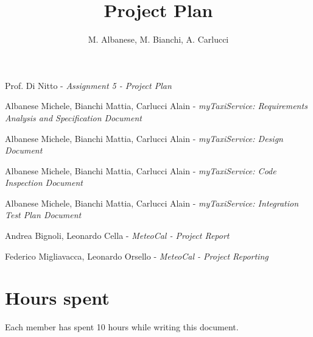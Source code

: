 \documentclass[a4paper, 12pt]{article}
\begin{document}
\title{Project Plan}

\author{M. Albanese, M. Bianchi, A. Carlucci}

\maketitle
\newpage{}
\tableofcontents{}

\newpage{}



\newpage



\newpage



\newpage



\newpage



\appendix

\clearpage
{}

\begin{thebibliography}{9}
    Prof. Di Nitto - \emph{Assignment 5 - Project Plan}

        Albanese Michele, Bianchi Mattia, Carlucci Alain - \emph{myTaxiService: Requirements Analysis and Specification Document}

        Albanese Michele, Bianchi Mattia, Carlucci Alain - \emph{myTaxiService: Design Document}

        Albanese Michele, Bianchi Mattia, Carlucci Alain - \emph{myTaxiService: Code Inspection Document}

        Albanese Michele, Bianchi Mattia, Carlucci Alain - \emph{myTaxiService: Integration Test Plan Document}

        Andrea Bignoli, Leonardo Cella - \emph{MeteoCal - Project Report}

Federico Migliavacca, Leonardo Orsello - \emph{MeteoCal - Project Reporting}

\end{thebibliography}

\vfill

\section*{Hours spent}
Each member has spent 10 hours while writing this document.
\end{document}
